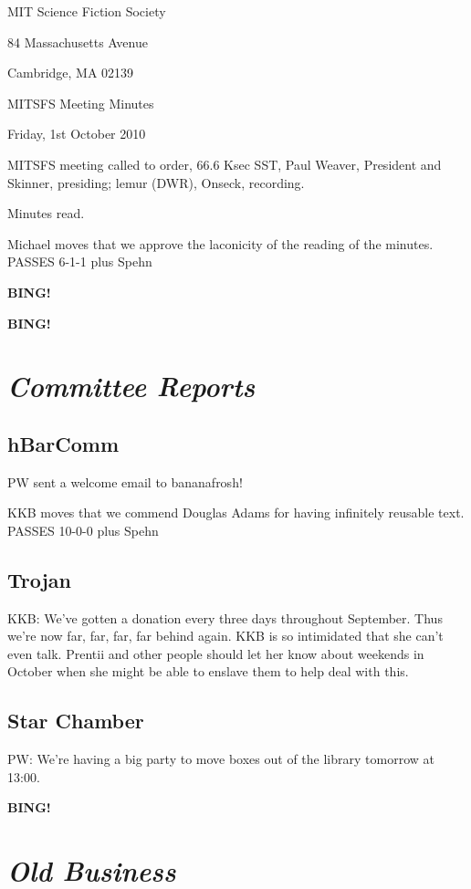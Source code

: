 \documentclass[10pt]{article}
\newcommand{\bing}{{\bf BING!} }
\newcommand{\goto}[1]{\bing \vskip 12pt \section*{{\em{#1}}}}
\newcommand{\ps}{ plus Spehn\xspace}
\newcommand{\skinner}{Paul Weaver, President and Skinner}
\newcommand{\onseck}{lemur (DWR), Onseck}
\newcommand{\meetingdate}{Friday, 1st October 2010}
\begin{document}
\begin{center}

MIT Science Fiction Society

84 Massachusetts Avenue

Cambridge, MA 02139

\vspace{12pt}

MITSFS Meeting Minutes

\meetingdate

\end{center}

\vspace{18pt}

\setlength{\parskip}{6pt}

\noindent
MITSFS meeting called to order, 66.6 Ksec SST,
\skinner, presiding; \onseck, recording.

Minutes read.

Michael moves that we approve the laconicity of the reading of the minutes.
PASSES 6-1-1\ps

\bing

\goto{Committee Reports}

\subsection*{hBarComm}

PW sent a welcome email to bananafrosh!

KKB moves that we commend Douglas Adams for having infinitely reusable text.
PASSES 10-0-0\ps

\subsection*{Trojan}

KKB: We've gotten a donation every three days throughout September.  Thus we're now
far, far, far, far behind again.  KKB is so intimidated that she can't even
talk.  Prentii and other people should let her know about weekends in October
when she might be able to enslave them to help deal with this.  

\subsection*{Star Chamber}

PW: We're having a big party to move boxes out of the library tomorrow at 13:00.

\goto{Old Business}
\end{document}

